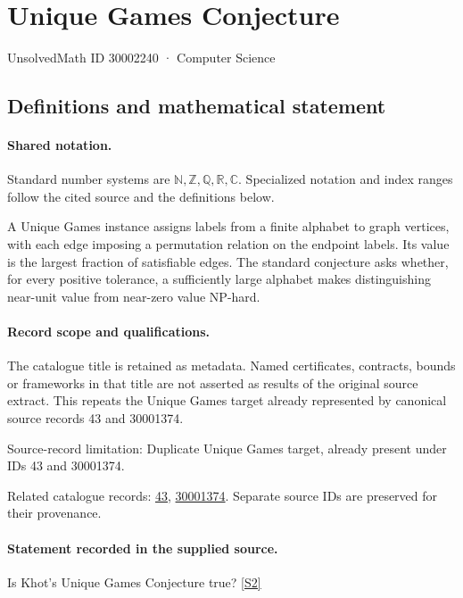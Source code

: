 \documentclass[11pt]{article}
\newcommand{\sref}[2]{\hyperlink{source:#1:#2}{[S#2]}}
\begin{document}
\setcounter{section}{30002239}
\section{Unique Games Conjecture}\label{30002240}
{\small\sffamily UnsolvedMath ID 30002240 · Computer Science}
\subsection{Definitions and mathematical statement}

\paragraph{Shared notation.}Standard number systems are $\mathbb N,\mathbb Z,\mathbb Q,\mathbb R,\mathbb C$. Specialized notation and index ranges follow the cited source and the definitions below.


A Unique Games instance assigns labels from a finite alphabet to graph vertices, with each edge imposing a permutation relation on the endpoint labels. Its value is the largest fraction of satisfiable edges. The standard conjecture asks whether, for every positive tolerance, a sufficiently large alphabet makes distinguishing near-unit value from near-zero value NP-hard.
\paragraph{Record scope and qualifications.}
The catalogue title is retained as metadata. Named certificates, contracts, bounds or frameworks in that title are not asserted as results of the original source extract.
This repeats the Unique Games target already represented by canonical source records 43 and 30001374.

Source-record limitation: Duplicate Unique Games target, already present under IDs 43 and 30001374.

Related catalogue records: \href{https://mehmetmars7.github.io/Erdosproblems-llm-hunter/problem.html?type=open_problems&id=43}{43}, \href{https://mehmetmars7.github.io/Erdosproblems-llm-hunter/problem.html?type=open_problems&id=30001374}{30001374}. Separate source IDs are preserved for their provenance.
\paragraph{Statement recorded in the supplied source.}
Is Khot's Unique Games Conjecture true? \sref{30002240}{2}
\end{document}
